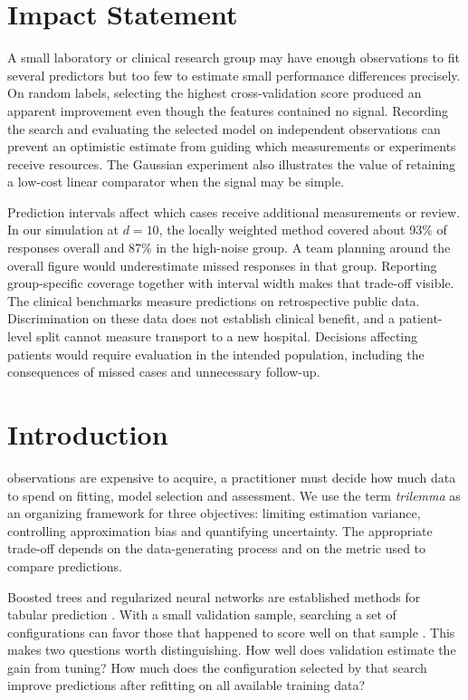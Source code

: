 \documentclass[journal]{IEEEtran}
\begin{document}
\section*{Impact Statement}
A small laboratory or clinical research group may have enough observations to fit several predictors but too few to estimate small performance differences precisely. On random labels, selecting the highest cross-validation score produced an apparent improvement even though the features contained no signal. Recording the search and evaluating the selected model on independent observations can prevent an optimistic estimate from guiding which measurements or experiments receive resources. The Gaussian experiment also illustrates the value of retaining a low-cost linear comparator when the signal may be simple.

Prediction intervals affect which cases receive additional measurements or review. In our simulation at $d=10$, the locally weighted method covered about 93\% of responses overall and 87\% in the high-noise group. A team planning around the overall figure would underestimate missed responses in that group. Reporting group-specific coverage together with interval width makes that trade-off visible. The clinical benchmarks measure predictions on retrospective public data. Discrimination on these data does not establish clinical benefit, and a patient-level split cannot measure transport to a new hospital. Decisions affecting patients would require evaluation in the intended population, including the consequences of missed cases and unnecessary follow-up.

\section{Introduction}

 observations are expensive to acquire, a practitioner must decide how much data to spend on fitting, model selection and assessment. We use the term \emph{trilemma} as an organizing framework for three objectives: limiting estimation variance, controlling approximation bias and quantifying uncertainty. The appropriate trade-off depends on the data-generating process and on the metric used to compare predictions.

Boosted trees and regularized neural networks are established methods for tabular prediction \cite{chen2016xgboost,ke2017lightgbm,kadra2021well,grinsztajn2022tree}. With a small validation sample, searching a set of configurations can favor those that happened to score well on that sample \cite{cawley2010selection,varoquaux2018cross}. This makes two questions worth distinguishing. How well does validation estimate the gain from tuning? How much does the configuration selected by that search improve predictions after refitting on all available training data?
\end{document}
